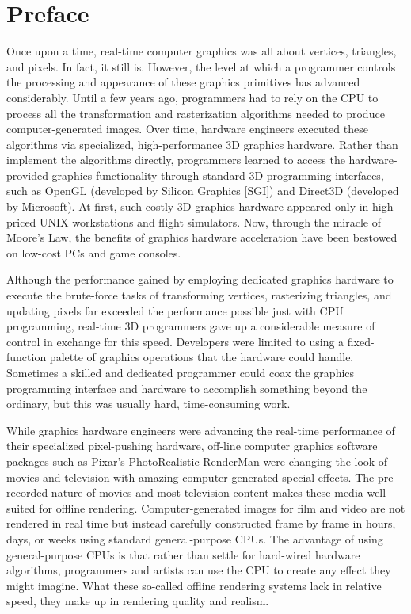 \documentclass[../main.tex]{subfiles}
\begin{document}
\chapter*{Preface}

Once upon a time, real-time computer graphics was all about vertices, triangles, and pixels. In fact, it still is. However, the level at which a programmer controls the processing and appearance of these graphics primitives has advanced considerably. Until a few years ago, programmers had to rely on the CPU to process all the transformation and rasterization algorithms needed to produce computer-generated images. Over time, hardware engineers executed these algorithms via specialized, high-performance 3D graphics hardware. Rather than implement the algorithms directly, programmers learned to access the hardware-provided graphics functionality through standard 3D programming interfaces, such as OpenGL (developed by Silicon Graphics [SGI]) and Direct3D (developed by Microsoft). At first, such costly 3D graphics hardware appeared only in high-priced UNIX workstations and flight simulators. Now, through the miracle of Moore's Law, the benefits of graphics hardware acceleration have been bestowed on low-cost PCs and game consoles.

Although the performance gained by employing dedicated graphics hardware to execute the brute-force tasks of transforming vertices, rasterizing triangles, and updating pixels far exceeded the performance possible just with CPU programming, real-time 3D programmers gave up a considerable measure of control in exchange for this speed. Developers were limited to using a fixed-function palette of graphics operations that the hardware could handle. Sometimes a skilled and dedicated programmer could coax the graphics programming interface and hardware to accomplish something beyond the ordinary, but this was usually hard, time-consuming work.

While graphics hardware engineers were advancing the real-time performance of their specialized pixel-pushing hardware, off-line computer graphics software packages such as Pixar's PhotoRealistic RenderMan were changing the look of movies and television with amazing computer-generated special effects. The pre-recorded nature of movies and most television content makes these media well suited for offline rendering. Computer-generated images for film and video are not rendered in real time but instead carefully constructed frame by frame in hours, days, or weeks using standard general-purpose CPUs. The advantage of using general-purpose CPUs is that rather than settle for hard-wired hardware algorithms, programmers and artists can use the CPU to create any effect they might imagine. What these so-called offline rendering systems lack in relative speed, they make up in rendering quality and realism.
\end{document}
